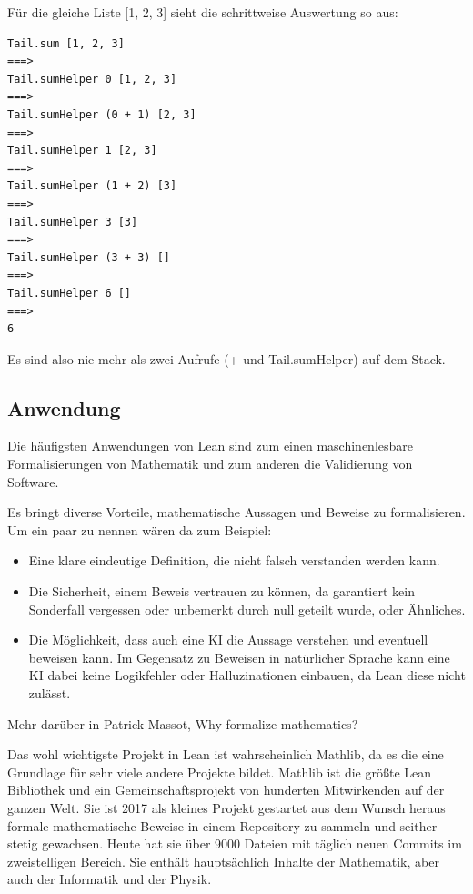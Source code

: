 Für die gleiche Liste [1, 2, 3] sieht die schrittweise Auswertung so aus:

\newpage
\begin{lstlisting}
Tail.sum [1, 2, 3]
===>
Tail.sumHelper 0 [1, 2, 3]
===>
Tail.sumHelper (0 + 1) [2, 3]
===>
Tail.sumHelper 1 [2, 3]
===>
Tail.sumHelper (1 + 2) [3]
===>
Tail.sumHelper 3 [3]
===>
Tail.sumHelper (3 + 3) []
===>
Tail.sumHelper 6 []
===>
6
\end{lstlisting}

Es sind also nie mehr als zwei Aufrufe (+ und Tail.sumHelper) auf dem Stack.

\subsection{Anwendung}
Die häufigsten Anwendungen von Lean sind zum einen maschinenlesbare Formalisierungen von Mathematik und zum anderen die Validierung von Software.

Es bringt diverse Vorteile, mathematische Aussagen und Beweise zu formalisieren.
Um ein paar zu nennen wären da zum Beispiel:
\begin{itemize}
  \item Eine klare eindeutige Definition, die nicht falsch verstanden werden kann.
  \item Die Sicherheit, einem Beweis vertrauen zu können, da garantiert kein Sonderfall vergessen oder unbemerkt durch null geteilt wurde, oder Ähnliches.
  \item Die Möglichkeit, dass auch eine KI die Aussage verstehen und eventuell beweisen kann.
        Im Gegensatz zu Beweisen in natürlicher Sprache kann eine KI dabei keine Logikfehler oder Halluzinationen einbauen, da Lean diese nicht zulässt.
\end{itemize}
Mehr darüber in Patrick Massot, Why formalize mathematics?\cite{why_formalize}

Das wohl wichtigste Projekt in Lean ist wahrscheinlich Mathlib\cite{mathlib2020}, da es die eine Grundlage für sehr viele andere Projekte bildet.
Mathlib ist die größte Lean Bibliothek und ein Gemeinschaftsprojekt von hunderten Mitwirkenden auf der ganzen Welt.
Sie ist 2017 als kleines Projekt gestartet aus dem Wunsch heraus formale mathematische Beweise in einem Repository zu sammeln und seither stetig gewachsen.
Heute hat sie über 9000 Dateien mit täglich neuen Commits im zweistelligen Bereich.
Sie enthält hauptsächlich Inhalte der Mathematik, aber auch der Informatik und der Physik.

